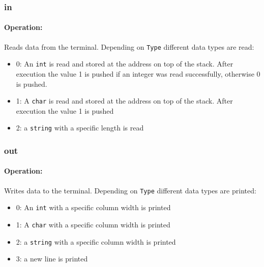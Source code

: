 \subsubsection{in}\label{sec:in}

\paragraph{Operation:}
Reads data from the terminal. Depending on \lstinline$Type$ different data types are read:

\begin{itemize}
	\item 0: An \lstinline$int$ is read and stored at the address on top of the stack. After execution the value 1 is pushed if an integer was read successfully, otherwise 0 is pushed.
	\item 1: A \lstinline$char$ is read and stored at the address on top of the stack. After execution the value 1 is pushed 
	\item 2: a \lstinline$string$ with a specific length is read
\end{itemize}

\subsubsection{out}\label{sec:out}

\paragraph{Operation:}
Writes data to the terminal. Depending on \lstinline$Type$ different data types are printed:

\begin{itemize}
	\item 0: An \lstinline$int$ with a specific column width is printed
	\item 1: A \lstinline$char$ with a specific column width is printed
	\item 2: a \lstinline$string$ with a specific column width is printed
	\item 3: a new line is printed
\end{itemize}
	
